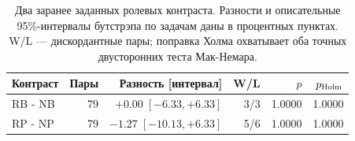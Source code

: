 \begin{table}[t]\centering\small
\caption{Два заранее заданных ролевых контраста. Разности и описательные 95\%-интервалы бутстрэпа по задачам даны в процентных пунктах. W/L --- дискордантные пары; поправка Холма охватывает оба точных двусторонних теста Мак-Немара.}\label{tab:seg80-tests}
\begin{tabular*}{\linewidth}{@{\extracolsep{\fill}}lrrrrr}\toprule
Контраст & Пары & Разность [интервал] & W/L & $p$ & $p_{\rm Holm}$\\
\midrule
RB - NB & 79 & $+0.00\;[-6.33,+6.33]$ & 3/3 & 1.0000 & 1.0000\\
RP - NP & 79 & $-1.27\;[-10.13,+6.33]$ & 5/6 & 1.0000 & 1.0000\\
\bottomrule\end{tabular*}\end{table}
